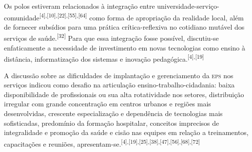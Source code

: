 \documentclass{article}
\begin{document}
Os polos estiveram relacionados à integração entre
universidade-serviço-comunidade\textsuperscript{[}\textsuperscript{4}\textsuperscript{]}\textsuperscript{,}\textsuperscript{[}\textsuperscript{10}\textsuperscript{]}\textsuperscript{,}\textsuperscript{[}\textsuperscript{22}\textsuperscript{]}\textsuperscript{,}\textsuperscript{[}\textsuperscript{55}\textsuperscript{]}\textsuperscript{,}\textsuperscript{[}\textsuperscript{64}\textsuperscript{]}
como forma de apropriação da realidade local, além de fornecer subsídios para
uma prática crítica-reflexiva no cotidiano mutável dos serviços de saúde.\textsuperscript{[}\textsuperscript{32}\textsuperscript{]}
Para que essa integração fosse possível, discutiu-se enfaticamente a necessidade
de investimento em novas tecnologias como ensino à distância, informatização dos
sistemas e inovação pedagógica.\textsuperscript{[}\textsuperscript{4}\textsuperscript{]}\textsuperscript{,}\textsuperscript{[}\textsuperscript{19}\textsuperscript{]}

A discussão sobre as dificuldades de implantação e gerenciamento da \textsc{eps} nos
serviços indicou como desafio na articulação ensino-trabalho-cidadania: baixa
disponibilidade de profissionais ou sua alta rotatividade nos setores,
distribuição irregular com grande concentração em centros urbanos e regiões mais
desenvolvidas, crescente especialização e dependência de tecnologias mais
sofisticadas, predomínio da formação hospitalar, conceitos imprecisos de
integralidade e promoção da saúde e cisão nas equipes em relação a treinamentos,
capacitações e reuniões, apresentam-se.\textsuperscript{[}\textsuperscript{4}\textsuperscript{]}\textsuperscript{,}\textsuperscript{[}\textsuperscript{19}\textsuperscript{]}\textsuperscript{,}\textsuperscript{[}\textsuperscript{25}\textsuperscript{]}\textsuperscript{,}\textsuperscript{[}\textsuperscript{38}\textsuperscript{]}\textsuperscript{,}\textsuperscript{[}\textsuperscript{47}\textsuperscript{]}\textsuperscript{,}\textsuperscript{[}\textsuperscript{56}\textsuperscript{]}\textsuperscript{,}\textsuperscript{[}\textsuperscript{68}\textsuperscript{]}\textsuperscript{,}\textsuperscript{[}\textsuperscript{72}\textsuperscript{]}
\end{document}
